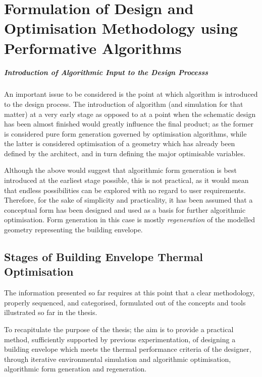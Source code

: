 \chapter{Formulation of Design and Optimisation Methodology using Performative Algorithms}

\paragraph{Introduction of Algorithmic Input to the Design Process\mbox{}\vspace{-0.3cm}s}\mbox{}

An important issue to be considered is the point at which algorithm is introduced to the design process. The introduction of algorithm (and simulation for that matter) at a very early stage as opposed to at a point when the schematic design has been almost finished would greatly influence the final product; as the former is considered pure form generation governed by optimisation algorithms, while the latter is considered optimisation of a geometry which has already been defined by the architect, and in turn defining the major optimisable variables.

Although the above would suggest that algorithmic form generation is best introduced at the earliest stage possible, this is not practical, as it would mean that endless possibilities can be explored with no regard to user requirements. Therefore, for the sake of simplicity and practicality, it has been assumed that a conceptual form has been designed and used as a basis for further algorithmic optimisation. Form generation in this case is mostly \emph{regeneration} of the modelled geometry representing the building envelope.

\section{Stages of Building Envelope Thermal Optimisation}

The information presented so far requires at this point that a clear methodology, properly sequenced, and categorised, formulated out of the concepts and tools illustrated so far in the thesis.

To recapitulate the purpose of the thesis; the aim is to provide a practical method, sufficiently supported by previous experimentation, of designing a building envelope which meets the thermal performance criteria of the designer, through iterative environmental simulation and algorithmic optimisation, algorithmic form generation and regeneration.

